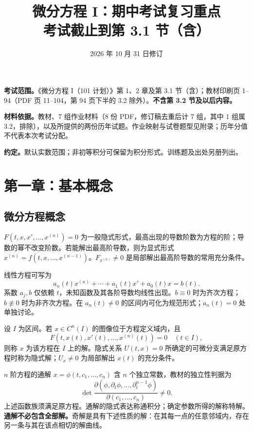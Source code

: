 
\title{微分方程 I：期中考试复习重点\\\large 考试截止到第 3.1 节（含）}
\author{}\date{2026 年 10 月 31 日修订}
\maketitle\vspace{-1.5em}
\textbf{考试范围。}《微分方程 I（101 计划）》第 1、2 章及第 3.1 节（含）；教材印刷页 1--94（PDF 页 11--104，第 94 页下半的 3.2 除外）。\textbf{不含第 3.2 节及以后内容。}

\textbf{材料依据。}教材、7 组作业材料（8 份 PDF，修订稿去重后计 7 组，其中 1 组属 3.2，排除），以及所提供的两份历年试题。作业映射与试卷题型见附录；历年分值不代表本次考试分配。

\textbf{约定。}默认实数范围；非初等积分可保留为积分形式。训练题及出处另册列出。
\setcounter{tocdepth}{1}\tableofcontents\newpage

\section{第一章：基本概念}
\setcounter{subsection}{1}
\subsection{微分方程概念}
$F(t,x,x',\ldots,x^{(n)})=0$ 为一般隐式形式，最高出现的导数阶数为方程的阶；导数的幂不改变阶数。若能解出最高阶导数，则为显式形式 $x^{(n)}=f(t,x,\ldots,x^{(n-1)})$。$F_{x^{(n)}}\ne0$ 是局部解出最高阶导数的常用充分条件。

线性方程可写为
\[
a_n(t)x^{(n)}+\cdots+a_1(t)x'+a_0(t)x=b(t).
\]
系数 $a_j,b$ 仅依赖 $t$，未知函数及其各阶导数均线性出现。$b\equiv0$ 时为齐次方程；$b\not\equiv0$ 时为非齐次方程。在 $a_n(t)\ne0$ 的区间内可化为规范形式；$a_n(t)=0$ 处单独讨论。

设 $I$ 为区间。若 $x\in C^n(I)$ 的图像位于方程定义域内，且
\[
F(t,x(t),x'(t),\ldots,x^{(n)}(t))=0\quad(t\in I),
\]
则称 $x$ 为该方程在 $I$ 上的解。隐式关系 $U(t,x)=0$ 所确定的可微分支满足原方程时称为隐式解；$U_x\ne0$ 为局部解出 $x(t)$ 的充分条件。

$n$ 阶方程的通解 $x=\phi(t,c_1,\ldots,c_n)$ 含 $n$ 个独立常数，教材的独立性判据为
\[
\det\frac{\partial(\phi,\partial_t\phi,\ldots,\partial_t^{n-1}\phi)}{\partial(c_1,\ldots,c_n)}\ne0.
\]
上述函数族须满足原方程。通解的隐式表达称通积分；确定参数所得的解称特解。\textbf{通解不必包含全部解。}奇解是具有下述性质的解：在其每一点的任意邻域内，存在另一条与其在该点相切的解曲线。

